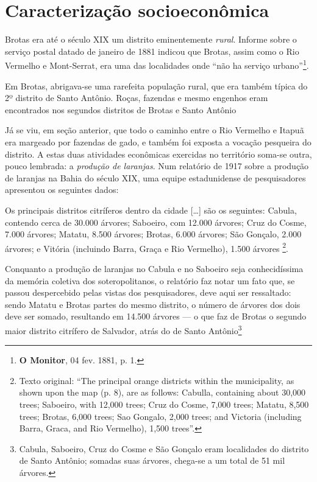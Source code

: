 \section{Caracterização socioeconômica}\label{sec:2.2}

Brotas era até o século XIX um distrito eminentemente \textit{rural}. Informe sobre o serviço postal datado de janeiro de 1881 indicou que Brotas, assim como o Rio Vermelho e Mont-Serrat, era uma das localidades onde ``não ha serviço urbano''\footnote{\textbf{O Monitor}, 04 fev. 1881, p. 1.}.

\begin{citacao}
Em Brotas, abrigava-se uma rarefeita população rural, que era também típica do 2º distrito de Santo Antônio. Roças, fazendas e mesmo engenhos eram encontrados nos segundos distritos de Brotas e Santo Antônio \cite[p.~52]{NASCIMENTO2007}
\end{citacao}

Já se viu, em seção anterior, que todo o caminho entre o Rio Vermelho e Itapuã era margeado por fazendas de gado, e também foi exposta a vocação pesqueira do distrito. A estas duas atividades econômicas exercidas no território soma-se outra, pouco lembrada: a \textit{produção de laranjas}. Num relatório de 1917 sobre a produção de laranjas na Bahia do século XIX, uma equipe estadunidense de pesquisadores apresentou os seguintes dados:

\begin{citacao}
Os principais distritos citríferos dentro da cidade [\dots] são os seguintes: Cabula, contendo cerca de 30.000 árvores; Saboeiro, com 12.000 árvores; Cruz do Cosme, 7.000 árvores; Matatu, 8.500 árvores; Brotas, 6.000 árvores; São Gonçalo, 2.000 árvores; e Vitória (incluindo Barra, Graça e Rio Vermelho), 1.500 árvores \cite[p.~3]{dorsett_orange_1917}\footnote{Texto original: ``The principal orange districts within the municipality, as shown upon the map (p. 8), are as follows: Cabulla, containing about 30,000 trees; Saboeiro, with 12,000 trees; Cruz do Cosme, 7,000 trees; Matatu, 8,500 trees; Brotas, 6,000 trees; Sao Gongalo, 2,000 trees; and Victoria (including Barra, Graca, and Rio Vermelho), 1,500 trees''.}.
\end{citacao}

Conquanto a produção de laranjas no Cabula e no Saboeiro seja conhecidíssima da memória coletiva dos soteropolitanos, o relatório faz notar um fato que, se passou despercebido pelas vistas dos pesquisadores, deve aqui ser ressaltado: sendo Matatu e Brotas partes do mesmo distrito, o número de árvores dos dois deve ser somado, resultando em 14.500 árvores --- o que faz de Brotas o segundo maior distrito citrífero de Salvador, atrás do de Santo Antônio\footnote{Cabula, Saboeiro, Cruz do Cosme e São Gonçalo eram localidades do distrito de Santo Antônio; somadas suas árvores, chega-se a um total de 51 mil árvores.}

